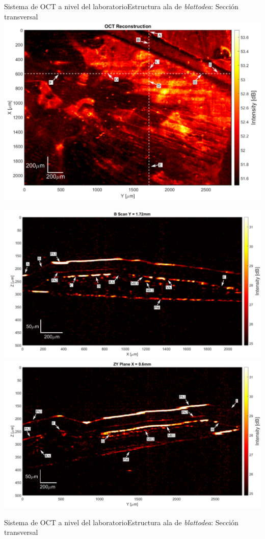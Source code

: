 \documentclass[fleqn,10pt]{beamer}
\begin{document}
\begin{frame}{Sistema de OCT a nivel del laboratorio}{Estructura ala de \emph{blattodea}: Sección transversal}
	\centering
	\includegraphics[width=0.6\linewidth]{AAUgraphics/pt2/OCT_projection_points}
	
	\vfill
	\includegraphics[width=0.49\linewidth]{AAUgraphics/pt2/Bscan_Wing}
	\includegraphics[width=0.49\linewidth]{AAUgraphics/pt2/ZY_Wing}
\end{frame}

\begin{frame}{Sistema de OCT a nivel del laboratorio}{Estructura ala de \emph{blattodea}: Sección transversal}
	\begin{center}
	\end{center}
\end{frame}

%	
%	
\end{document}
